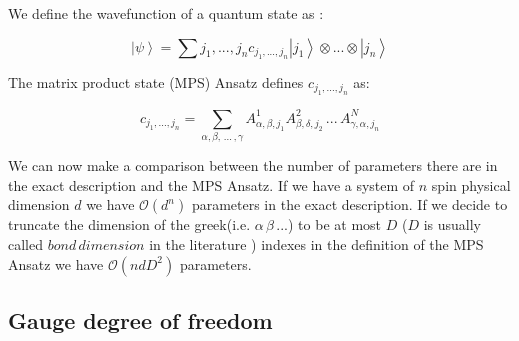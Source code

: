 \documentclass[12pt, a4paper, twoside, titlepage]{article}
\newcommand{\ket}[1]{\ensuremath{\left|#1\right\rangle}}
\begin{document}
We define the wavefunction of a quantum state as \cite{Schollw_ck_2011}:

\begin{equation}
\ket \psi = \sum{j_1,...,j_n} c_{j_1,...,j_n}  \ket{j_1} \otimes ... \otimes \ket{j_n}
\end{equation}

The matrix product state (MPS) Ansatz defines $c_{j_1,...,j_n}$ as:

\begin{equation}
c_{j_1,...,j_n}= \sum_{\alpha , \beta, \, ... \, , \gamma } A^{1}_{\alpha , \beta , j_1} A^{2}_{ \beta , \delta ,  j_2} \, ... \, A^{N}_{  \gamma , \alpha ,j_n}
\end{equation}

We can now make a comparison between the number of parameters there are in the exact description and the MPS Ansatz. If we have a system of $n$ spin physical dimension $d$ we have $\mathcal{O}(d^n)$ parameters in the exact description. If we decide to truncate the dimension of the greek(i.e. $\alpha \, \beta \, ...$) to be at most $D$ ($D$ is usually called $bond \, dimension$ in the literature ) indexes in the definition of the MPS Ansatz we have $\mathcal{O}(n d D^2 )$ parameters. \\
\subsection{Gauge degree of freedom}
\end{document}
